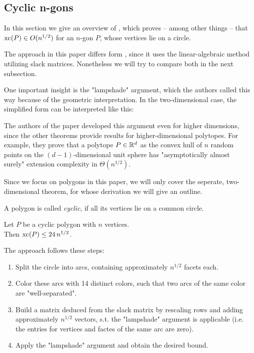 \subsection{Cyclic n-gons}

In this section we give an overview of \cite{kwan2020extension}, which proves -- among other things -- that $\operatorname{xc}(P) \in O(n^{1/2})$ for an $n$-gon $P$, whose vertices lie on a circle.

The approach in this paper differs form \cite{shitov2020sublinear}, since it uses the linear-algebraic method utilizing slack matrices. Nonetheless we will try to compare both in the next subsection.

One important insight is the "lampshade" argument, which the authors called this way because of the geometric interpretation. In the two-dimensional case, the simplified form can be interpreted like this:

The authors of the paper developed this argument even for higher dimensions, since the other theorems provide results for higher-dimensional polytopes. For example, they prove that a polytope $P \in \mathbb{R}^d$ as the convex hull of $n$ random points on the $(d-1)$-dimensional unit sphere has "asymptotically almost surely" extension complexity in $\Theta(n^{1/2})$.

Since we focus on polygons in this paper, we will only cover the seperate, two-dimensional theorem, for whose derivation we will give an outline.

\begin{definition}
  A polygon is called \emph{cyclic}, if all its vertices lie on a common circle.
\end{definition}

\begin{theorem}
  Let $P$ be a cyclic polygon with $n$ vertices.\\
  Then $\operatorname{xc}(P) \leq 24\,n^{1/2}$.
\end{theorem}

The approach follows these steps:

\begin{enumerate}
  \item Split the circle into arcs, containing approximately $n^{1/2}$ facets each.
  \item Color these arcs with 14 distinct colors, such that two arcs of the same color are "well-separated".
  \item Build a matrix deduced from the slack matrix by rescaling rows and adding approximately $n^{1/2}$ vectors, s.t. the "lampshade" argument is applicable (i.e. the entries for vertices and factes of the same arc are zero).
  \item Apply the "lampshade" argument and obtain the desired bound.
\end{enumerate}

